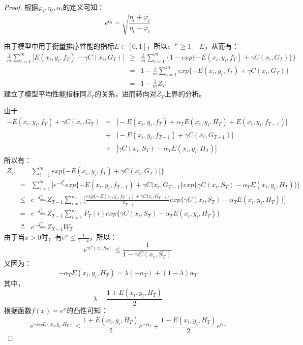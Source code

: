 \begin{proof}
根据$\varphi_t, \eta_t, \alpha_t$的定义可知：
\begin{equation}
    e^{\alpha_t} = \sqrt{\frac{\eta_t + \varphi_t}{\eta_t - \varphi_t}}
\end{equation}

由于模型中用于衡量排序性能的指标$E\in [0,1]$，所以$e^{-E} \ge 1-E$，从而有：
\begin{equation}
    \begin{array}{lll}
      \frac{1}{m} \sum\limits_{i=1}^m \bigg[E(x_i, y_i, f_T) - \gamma C(x_i, G_T)\bigg] & \ge & \frac{1}{m} \sum\limits_{i=1}^m \bigg\{ 1 - exp\{-E(x_i, y_i, f_T) + \gamma C(x_i, G_T)\} \bigg\} \\
       & = & 1 - \frac{1}{m} \sum\limits_{i=1}^m exp\{-E(x_i, y_i, f_T) + \gamma C(x_i, G_T)\} \\
       & = & 1 - \frac{1}{m} Z_T
    \end{array}
\end{equation}
建立了模型平均性能指标同$Z_T$的关系，进而转向对$Z_T$上界的分析。

由于
\[
\begin{array}{lll}
      -E(x_i, y_i, f_T) + \gamma C(x_i, G_T) & = & \big[-E(x_i, y_i, f_T) + \alpha_T E(x_i, y_i, H_T) + E(x_i, y_i, f_{T-1})\big] \\
       & + & \big[- E(x_i, y_i, f_{T-1}) + \gamma C(x_i, G_{T-1}) \big]\\
       & + & \big[\gamma C(x_i, S_T) - \alpha_T E(x_i, y_i, H_T) \big]
\end{array}
\]
所以有：
\begin{equation}
    \begin{array}{lll}
      Z_T & = & \sum\limits_{i=1}^m exp\{-E(x_i, y_i, f_T) + \gamma C(x_i, G_T) \big]\} \\
       & = & \sum\limits_{i=1}^m \bigg[e^{-\delta_i^T} exp\{-E(x_i, y_i, f_{T-1}) + \gamma C(x_i, G_{T-1}\} exp\{\gamma C(x_i, S_T) - \alpha_T E(x_i, y_i, H_T)\} \bigg] \\
       & \le & e^{-\delta_{min}^T} Z_{T-1} \sum\limits_{i=1}^m \bigg[\frac{exp\{-E(x_i, y_i, f_{T-1}) + \gamma C(x_i, G_{T-1}\}}{Z_{T-1}} exp\{\gamma C(x_i, S_T) - \alpha_T E(x_i, y_i, H_T)\}\bigg] \\
       & = & e^{-\delta_{min}^T} Z_{T-1} \sum\limits_{i=1}^m P_T(i) exp\{\gamma C(x_i, S_T) - \alpha_T E(x_i, y_i, H_T)\} \\
       & \triangleq & e^{-\delta_{min}^T} Z_{T-1}  W_T
    \end{array}
\end{equation}
由于当$x>0$时，有$e^x \le \frac{1}{1-x}$，所以：
\begin{equation}
    e^{\gamma C(x_i, S_T)} \le \frac{1}{1 - \gamma C(x_i, S_T)}
\end{equation}
又因为：
\[
    -\alpha_T E(x_i, y_i, H_T) = \lambda (-\alpha_T) + (1-\lambda) \alpha_T
\]
其中，
\[
    \lambda = \frac{1+E(x_i,y_i,H_T)}{2}
\]
根据函数$f(x)=e^x$的凸性可知：
\begin{equation}
    e^{-\alpha_T E(x_i, y_i, H_T)} \le \frac{1+E(x_i,y_i,H_T)}{2} e^{-\alpha_T} + \frac{1-E(x_i,y_i,H_T)}{2} e^{\alpha_T}
\end{equation}


\end{proof}
